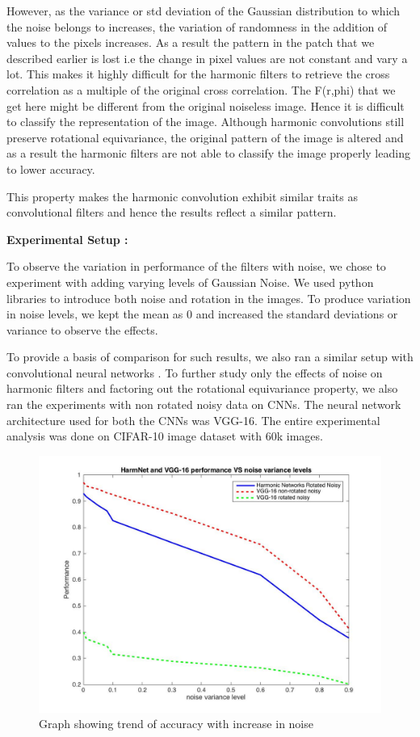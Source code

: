 \documentclass{article}
\begin{document}
However, as the variance or std deviation of the Gaussian distribution to which the noise belongs to increases, the variation of randomness in the addition of values to the pixels increases. As a result the pattern in the patch that we described earlier is lost i.e the change in pixel values are not constant and vary a lot. This makes it highly difficult for the harmonic filters to retrieve the cross correlation as a multiple of the original cross correlation. The F(r,phi) that we get here might be different from the original noiseless image. Hence it is difficult to classify the representation of the image. Although harmonic convolutions still preserve rotational equivariance, the original pattern of the image is altered and as a result the harmonic filters are not able to classify the image properly leading to lower accuracy.

This property makes the harmonic convolution exhibit similar traits as convolutional filters and hence the results reflect a similar pattern.

\textbf{Experimental Setup :}

To observe the variation in performance of the filters with noise, we chose to experiment with adding varying levels of Gaussian Noise. We used python libraries to introduce both noise and rotation in the images. To produce variation in noise levels, we kept the mean as 0 and increased the standard deviations or variance to observe the effects. 

To provide a basis of comparison for such results, we also ran a similar setup with convolutional neural networks . To further study only the effects of noise on harmonic filters and factoring out the rotational equivariance property, we also ran the experiments with non rotated noisy data on CNNs. The neural network architecture used for both the CNNs was VGG-16.
The entire experimental analysis was done on CIFAR-10 image dataset with 60k images.

\begin{figure}[t!]
  \includegraphics[width=\linewidth]{vggAndHarmVsNoise.jpg}
  \caption{Graph showing trend of accuracy with increase in noise}
  \label{fig:NoiseGraph}
\end{figure}
 
\end{document}
